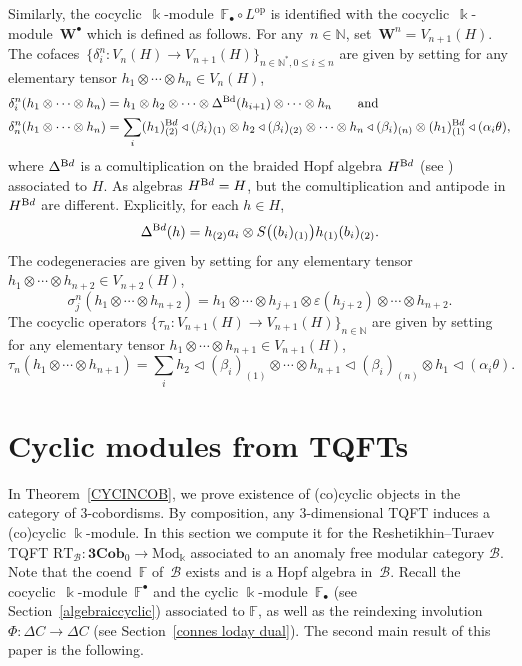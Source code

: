 \documentclass[10pt,a4paper]{amsart}
\numberwithin{equation}{section}
\newcommand{\co}{\colon}
\newcommand{\tens}{\otimes}
\newcommand{\mc}{\mathcal}
\newcommand{\opp}{\mathrm{op}}
\newcommand{\N}{\mathbb{N}}
\newcommand{\Mod}{\mathrm{Mod}}
\newcommand{\Cob}{\textbf{Cob}}
\newcommand{\kk}{\Bbbk}
\newcommand{\RT}{\text{RT}}
\newcommand{\coend}{\mathbb{F}}
\newcommand{\ltrn}{\triangleleft}
\begin{document}
Similarly, the cocyclic~$\kk$-module~$\coend_\bullet\circ L^\opp$ is identified with the cocyclic~$\kk$-module~$\textbf{W}^\bullet$ which is defined as follows.
For any~$n\in \N$, set~$\textbf{W}^n = V_{n+1}(H)$.
The cofaces~$\{\delta_i^n \co V_{n}(H) \to V_{n+1}(H)\}_{n\in \N^*, 0\le i \le n}$ are given by setting for any elementary tensor $h_1\otimes\cdots\otimes h_{n} \in V_n(H)$,
\begin{align*}
&\delta_i^n(h_1\otimes\cdots\otimes h_{n})=
	h_1\otimes h_2\otimes\cdots \otimes \Delta^{\text{Bd}}(h_{i+1}) \otimes\cdots \otimes h_{n} \qquad \text{and} \\
	&\delta_n^n(h_1\otimes \cdots\otimes h_{n})=\sum_i (h_1)_{(2)}^{\text Bd} \ltrn (\beta_i)_{(1)}\tens h_2 \ltrn (\beta_i)_{(2)} \tens \cdots \tens h_{n}\ltrn (\beta_i)_{(n)}\tens (h_1)_{(1)}^{\text Bd} \ltrn(\alpha_i\theta),
\end{align*}
where $\Delta^{\text Bd}$ is a comultiplication on the braided Hopf algebra $H^{\text Bd}$ (see \cite[Lemma 4.4]{virelizier_2006}) asso\-ciated to $H$. As algebras $H^{\text Bd}=H$, but the comultiplication and antipode in $H^{\text Bd}$ are different. Explicitly, for each $h\in H$,
\[
\Delta^{\text Bd}(h)=h_{(2)}a_i\tens S\bigl((b_i)_{(1)}\bigr)h_{(1)}(b_i)_{(2)}.
\]
The codegeneracies \smash{$\bigl\{\sigma_j^n \co V_{n+2}(H) \to V_{n+1}(H)\bigr\}_{n \in \N, 0\le j \le n}$} are given by setting for any elementary tensor~$h_1\otimes\cdots\otimes h_{n+2} \in V_{n+2}(H)$,
\[
\sigma_j^n(h_1\otimes \cdots \otimes h_{n+2})=
h_1\otimes\cdots\otimes h_{j+1}\otimes \varepsilon(h_{j+2})\otimes \cdots \otimes h_{n+2}.\]
The cocyclic operators $\{\tau_n \co V_{n+1}(H) \to V_{n+1}(H)\}_{n\in \N}$ are given by setting for any elementary tensor $h_1\otimes\cdots\otimes h_{n+1} \in V_{n+1}(H)$,
\[\tau_n(h_1\tens \cdots \tens h_{n+1})= \sum_i h_2\ltrn (\beta_i)_{(1)}\tens \cdots \tens h_{n+1}\ltrn (\beta_i)_{(n)}\tens h_1 \ltrn(\alpha_i\theta).\]

\section{Cyclic modules from TQFTs}\label{tftsrel}

In Theorem~\ref{CYCINCOB}, we prove existence of (co)cyclic objects in the category of $3$-cobordisms. By composition, any $3$-dimensional TQFT induces a (co)cyclic $\kk$-module.
In this section we compute it for the Reshetikhin--Turaev TQFT $\RT_{\mc B} \co \textbf{3}\Cob_0 \to \Mod_\kk$ associated to an anomaly free modular category $\mc B$. Note that the coend~$\coend$ of~$\mc B$ exists and is a Hopf algebra in~$\mc B$. Recall the cocyclic~$\kk$-module~$\coend^\bullet$ and the cyclic $\kk$-module~$\coend_\bullet$ (see Section~\ref{algebraiccyclic}) associated to $\coend$, as well as the reindexing involution~$\Phi \co \Delta C \to \Delta C$ (see Section~\ref{connes loday dual}).
The second main result of this paper is the following.
\end{document}
